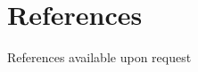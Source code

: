 \documentclass[11pt,a4paper]{moderncv}
\begin{document}
\closesection{}                   %
\renewcommand{\listitemsymbol}{-} %



\section{References}
References available upon request
\end{document}
